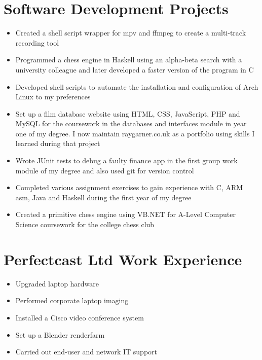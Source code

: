 \documentclass{article}
\begin{document}
\section{Software Development Projects}

\begin{itemize}[noitemsep]

\renewcommand{\labelitemi}{$\square$}

\item Created a shell script wrapper for mpv and ffmpeg to create a multi-track recording tool
\item Programmed a chess engine in Haskell using an alpha-beta search with a university colleague and later developed a faster version of the program in C
\item Developed shell scripts to automate the installation and configuration of Arch Linux to my preferences 
\item Set up a film database website using HTML, CSS, JavaScript, PHP and MySQL for the coursework in the databases and interfaces module in year one of my degree. I now maintain raygarner.co.uk as a portfolio using skills I learned during that project
\item Wrote JUnit tests to debug a faulty finance app in the first group work module of my degree and also used git for version control
\item Completed various assignment exercises to gain experience with C, ARM asm, Java and Haskell during the first year of my degree
\item Created a primitive chess engine using VB.NET for A-Level Computer Science coursework for the college chess club

\end{itemize}




\section{Perfectcast Ltd Work Experience}


\begin{itemize}[noitemsep]

\renewcommand{\labelitemi}{$\square$}
\item Upgraded laptop hardware
\item Performed corporate laptop imaging
\item Installed a Cisco video conference system 
\item Set up a Blender renderfarm
\item Carried out end-user and network IT support

\end{itemize}
\end{document}

